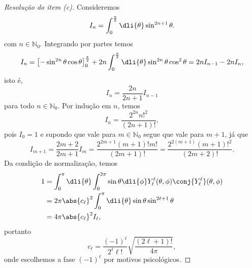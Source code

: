 \begin{proof}[Resolução do item (c)]
    Consideremos
    \begin{equation*}
        I_n = \int_0^{\frac{\pi}{2}}\dli{\theta} \sin^{2n+1}\theta.
    \end{equation*}
    com \(n \in \mathbb{N}_0\). Integrando por partes temos
    \begin{equation*}
        I_n = \left[-\sin^{2n}\theta \cos\theta\right]_0^{\frac\pi2} + 2n \int_0^{\frac\pi2} \dli{\theta} \sin^{2n}\theta \cos^2\theta = 2n I_{n - 1} - 2n I_n,
    \end{equation*}
    isto é,
    \begin{equation*}
        I_n = \frac{2n}{2n + 1} I_{n-1}
    \end{equation*}
    para todo \(n \in \mathbb{N}_0\). Por indução em \(n\), temos
    \begin{equation*}
        I_n = \frac{2^{2n}n!^2}{(2n+1)!},
    \end{equation*}
    pois \(I_0 = 1\) e supondo que vale para \(m \in \mathbb{N}_0\) segue que vale para \(m+1\), já que
    \begin{equation*}
        I_{m+1} = \frac{2m+2}{2m+1} I_{m} = \frac{2^{2m + 1}(m+1)!m!}{(2m+1)!} = \frac{2^{2(m+1)}(m+1)!^2}{(2m+2)!}.
    \end{equation*}
    Da condição de normalização, temos
    \begin{align*}
        1 &= \int_0^{\pi}\dli{\theta} \int_0^{2\pi} \sin\theta \dli{\phi} Y_\ell^\ell(\theta,\phi) \conj{Y_\ell^\ell}(\theta,\phi)\\
          &= 2\pi \abs{c_\ell}^2\int_0^\pi \dli{\theta}\sin\theta \sin^{2\ell + 1}\theta\\
          &= 4\pi \abs{c_\ell}^2 I_\ell,
    \end{align*}
    portanto
    \begin{equation*}
        c_\ell = \frac{(-1)^{\ell}}{2^\ell \ell!}\sqrt{\frac{(2\ell+1)!}{4\pi}},
    \end{equation*}
    onde escolhemos a fase \((-1)^\ell\) por motivos psicológicos.
\end{proof}
